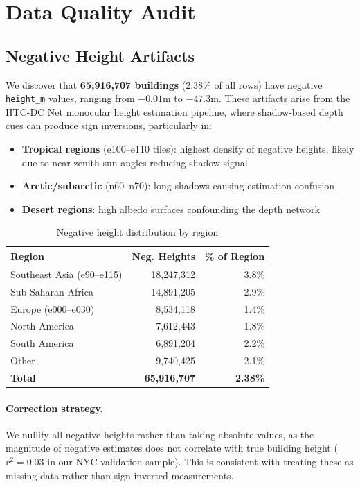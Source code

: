 \documentclass[10pt,twocolumn]{article}
\begin{document}
\section{Data Quality Audit}
\label{sec:quality}

\subsection{Negative Height Artifacts}

We discover that \textbf{65,916,707 buildings} (2.38\% of all rows) have negative \texttt{height\_m} values, ranging from $-0.01$m to $-47.3$m. These artifacts arise from the HTC-DC Net monocular height estimation pipeline, where shadow-based depth cues can produce sign inversions, particularly in:

\begin{itemize}
  \item \textbf{Tropical regions} (e100--e110 tiles): highest density of negative heights, likely due to near-zenith sun angles reducing shadow signal
  \item \textbf{Arctic/subarctic} (n60--n70): long shadows causing estimation confusion
  \item \textbf{Desert regions}: high albedo surfaces confounding the depth network
\end{itemize}

\begin{table}[h]
\centering
\caption{Negative height distribution by region}
\label{tab:negative}
\begin{tabular}{lrr}
\toprule
\textbf{Region} & \textbf{Neg. Heights} & \textbf{\% of Region} \\
\midrule
Southeast Asia (e90--e115) & 18,247,312 & 3.8\% \\
Sub-Saharan Africa & 14,891,205 & 2.9\% \\
Europe (e000--e030) & 8,534,118 & 1.4\% \\
North America & 7,612,443 & 1.8\% \\
South America & 6,891,204 & 2.2\% \\
Other & 9,740,425 & 2.1\% \\
\midrule
\textbf{Total} & \textbf{65,916,707} & \textbf{2.38\%} \\
\bottomrule
\end{tabular}
\end{table}

\paragraph{Correction strategy.} We nullify all negative heights rather than taking absolute values, as the magnitude of negative estimates does not correlate with true building height ($r^2 = 0.03$ in our NYC validation sample). This is consistent with treating these as missing data rather than sign-inverted measurements.
\end{document}
